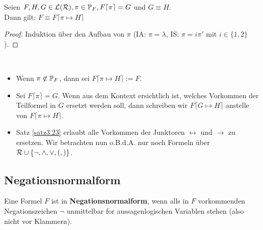 \begin{satz}\label{satz3.23}
	Seien $F,H,G\in\L(\RR),\pi\in\P_F,F\lceil\pi\rceil=G$ und $G\equiv H$.\\
	Dann gilt: $F\equiv F\lceil\pi\mapsto H\rceil$
\end{satz}

\begin{proof}
	Induktion über den Aufbau von $\pi$ (IA: $\pi=\lambda$, IS: $\pi=i\pi'$ mit $i\in\lbrace1,2\rbrace$).
\end{proof}

\begin{konvention}\
	\begin{itemize}
		\item Wenn $\pi\not\in\P_F$, dann sei $F\lceil\pi\mapsto H\rceil:=F$.
		\item Sei $F\lceil\pi\rceil=G$. Wenn aus dem Kontext ersichtlich ist, welches Vorkommen der Teilformel in $G$ ersetzt werden soll, dann schreiben wir $F\lceil G\mapsto H\rceil$ anstelle von $F\lceil\pi\mapsto H\rceil$.
		\item Satz \ref{satz3.23} erlaubt alle Vorkommen der Junktoren $\leftrightarrow$ und $\to$ zu ersetzen. Wir betrachten nun o.B.d.A. nur noch Formeln über $\RR\cup\lbrace\neg,\wedge,\vee,(,)\rbrace$.
	\end{itemize}
\end{konvention}

\subsection{Negationsnormalform}

\begin{definition}\label{def3.24}
	Eine Formel $F$ ist in \textbf{Negationsnormalform}, wenn alls in $F$ vorkommenden Negationszeichen $\neg$ unmittelbar for aussagenlogischen Variablen stehen (also nicht vor Klammern).
\end{definition}

